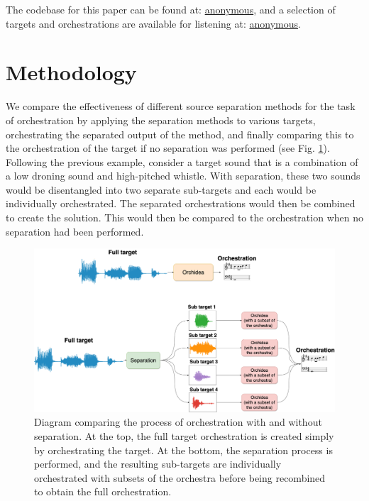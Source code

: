 \documentclass{article}
\begin{document}
  The codebase for this paper can be found at: \url{anonymous}, and a selection of targets and orchestrations are available for listening at: \url{anonymous}.
    
  
  \section{Methodology}\label{sec:methodology}
  
  We compare the effectiveness of different source separation methods for the task of orchestration by applying the separation methods to various targets, orchestrating the separated output of the method, and finally comparing this to the orchestration of the target if no separation was performed (see Fig. \ref{fig:full_diagram}). Following the previous example, consider a target sound that is a combination of a low droning sound and high-pitched whistle. With separation, these two sounds would be disentangled into two separate sub-targets and each would be individually orchestrated. The separated orchestrations would then be combined to create the solution. This would then be compared to the orchestration when no separation had been performed.
  

  \begin{figure}[t]
    \centering
      \includegraphics[width=\columnwidth]{figures/diagram.png}
      \caption{Diagram comparing the process of orchestration with and without separation. At the top, the full target orchestration is created simply by orchestrating the target. At the bottom, the separation process is performed, and the resulting sub-targets are individually orchestrated with subsets of the orchestra before being recombined to obtain the full orchestration.}\label{fig:full_diagram}
  \end{figure}  
\end{document}
